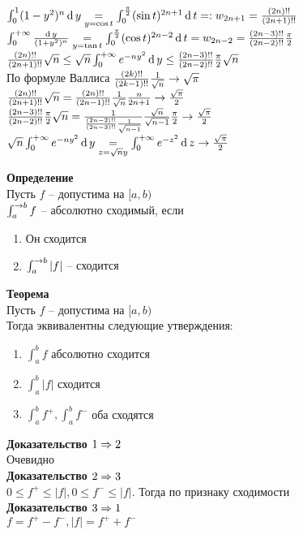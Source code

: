 \documentclass[12pt]{article}
\begin{document}
\begin{enumerate}
    $\int_0^1 (1-y^2)^n \operatorname{d} y \underset{y=\cos t}= \int_0^{\frac\pi2}(\sin t)^{2n+1} \operatorname{d} t =: w_{2n+1} = \frac{(2n)!!}{(2n+1)!!}$\\
    $\int_0^{+\infty} \frac{\operatorname{d} y}{(1+y^2)^n} \underset{y=\tan t}= \int_0^{\frac\pi2} (\cos t)^{2n-2}\operatorname{d} t = w_{2n-2} = \frac{(2n-3)!!}{(2n-2)!!}\frac\pi2$\\
    $\frac{(2n)!!}{(2n+1)!!}\sqrt n \leq \sqrt n\int_0^{+\infty} e^{-ny^2}\operatorname{d} y \leq \frac{(2n-3)!!}{(2n-2)!!}\frac\pi2\sqrt n$\\
    По формуле Валлиса $\frac{(2k)!!}{(2k-1)!!}\frac1{\sqrt n} \rightarrow \sqrt \pi$\\
    $\frac{(2n)!!}{(2n+1)!!}\sqrt n = \frac{(2n)!!}{(2n-1)!!}\frac1{\sqrt n}\frac n{2n+1} \rightarrow \frac{\sqrt\pi}2$\\
    $\frac{(2n-3)!!}{(2n-2)!!}\frac\pi2\sqrt n = \frac1{\frac{(2n-2)!!}{(2n-3)!!}\frac1{\sqrt {n-1}}}\frac{\sqrt n}{\sqrt{n-1}}\frac\pi2 \rightarrow \frac{\sqrt\pi}2$\\
    $\sqrt n\int_0^{+\infty} e^{-ny^2}\operatorname{d} y \underset{z=\sqrt n y}= \int_0^{+\infty}e^{-z^2}\operatorname{d} z \rightarrow \frac{\sqrt\pi}2$
\end{enumerate}
\textbf{Определение}\\
Пусть $f$ -- допустима на $[a,b)$\\
$\int_a^{\rightarrow b} f$ -- абсолютно сходимый, если
\begin{enumerate}
    \item Он сходится
    \item $\int_a^{\rightarrow b} |f|$ -- сходится
\end{enumerate}
\textbf{Теорема}\\
Пусть $f$ -- допустима на $[a,b)$\\
Тогда эквивалентны следующие утверждения:
\begin{enumerate}
    \item $\int_a^b f$ абсолютно сходится
    \item $\int_a^b |f|$ сходится
    \item $\int_a^b f^+, \int_a^b f^-$ оба сходятся
\end{enumerate}
\textbf{Доказательство $1 \Rightarrow 2$}\\
Очевидно\\
\textbf{Доказательство $2 \Rightarrow 3$}\\
$0 \leq f^+ \leq |f|, 0 \leq f^- \leq |f|$. Тогда по признаку сходимости\\
\textbf{Доказательство $3 \Rightarrow 1$}\\
$f = f^+ - f^-, |f| = f^+ + f^-$\\
\end{document}
